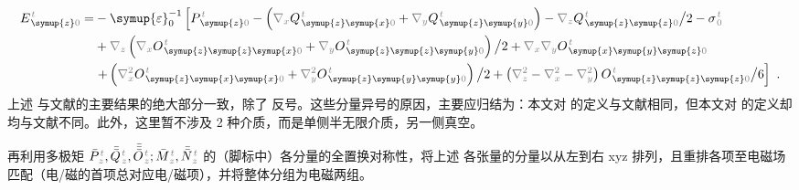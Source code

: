 \begin{subequations}
\begin{align}
	E^{\;\!\mathcolor{gray}{t}}_{\;\! \symup{z}\mathcolor{gray}{0}} = &- {\symup{\varepsilon}}_0^{-1} \left[ P^{\;\!\mathcolor{gray}{t}}_{\;\! \symup{z} \mathcolor{gray}{0}} - \left( \mathcolor{gray}{\nabla_x} Q^{\;\!\mathcolor{gray}{t}}_{\;\! \symup{z} \symup{x} \mathcolor{gray}{0}} + \mathcolor{gray}{\nabla_y} Q^{\;\!\mathcolor{gray}{t}}_{\;\! \symup{z} \symup{y} \mathcolor{gray}{0}} \right) - \mathcolor{gray}{\nabla_z} Q^{\;\!\mathcolor{gray}{t}}_{\;\! \symup{z} \symup{z} \mathcolor{gray}{0}} \big/ 2 - {\sigma}^{\;\!\mathcolor{gray}{t}}_{\;\! \mathcolor{gray}{0}} \right. \label{eq:E_z0=} \\ & + \mathcolor{gray}{\nabla_z} \left( \mathcolor{gray}{\nabla_x} O^{\;\!\mathcolor{gray}{t}}_{\;\! \symup{z} \symup{z} \symup{x} \mathcolor{gray}{0}} + \mathcolor{gray}{\nabla_y} O^{\;\!\mathcolor{gray}{t}}_{\;\! \symup{z} \symup{z} \symup{y} \mathcolor{gray}{0}} \right) \big/ 2 + \mathcolor{gray}{\nabla_x} \mathcolor{gray}{\nabla_y} O^{\;\!\mathcolor{gray}{t}}_{\;\! \symup{x} \symup{y} \symup{z} \mathcolor{gray}{0}} \\ & \left. + \left( \mathcolor{gray}{\nabla_x^2} O^{\;\!\mathcolor{gray}{t}}_{\;\! \symup{z} \symup{x} \symup{x} \mathcolor{gray}{0}} + \mathcolor{gray}{\nabla_y^2} O^{\;\!\mathcolor{gray}{t}}_{\;\! \symup{z} \symup{y} \symup{y} \mathcolor{gray}{0}} \right) \big/ 2 + \left( \mathcolor{gray}{\nabla_z^2} - \mathcolor{gray}{\nabla_x^2} - \mathcolor{gray}{\nabla_y^2} \right) O^{\;\!\mathcolor{gray}{t}}_{\;\! \symup{z} \symup{z} \symup{z} \mathcolor{gray}{0}} \big/ 6 \right] ~.
\end{align}
\end{subequations}
上述  与文献\cite{delangeElectromagneticBoundaryConditions2013}的主要结果的绝大部分一致，除了  反号。这些分量异号的原因，主要应归结为：本文对  的定义与文献\cite{delangeElectromagneticBoundaryConditions2013}相同，但本文对  的定义却均与文献\cite{delangeElectromagneticBoundaryConditions2013}不同。此外，这里暂不涉及 2 种介质，而是单侧半无限介质，另一侧真空。

再利用多极矩 $\bar{P}^{\;\!\mathcolor{gray}{t}}_{\;\!\mathcolor{gray}{z}},\bar{\bar{Q}}^{\;\!\mathcolor{gray}{t}}_{\;\!\mathcolor{gray}{z}},\bar{\bar{\bar{O}}}^{\;\!\mathcolor{gray}{t}}_{\;\!\mathcolor{gray}{z}} ; \bar{M}^{\;\!\mathcolor{gray}{t}}_{\;\!\mathcolor{gray}{z}}, \bar{\bar{N}}^{\;\!\mathcolor{gray}{t}}_{\;\!\mathcolor{gray}{z}}$ 的（脚标中）各分量的全置换对称性，将上述  各张量的分量以从左到右 xyz 排列，且重排各项至电磁场匹配（电/磁的首项总对应电/磁项），并将整体分组为电磁两组。

